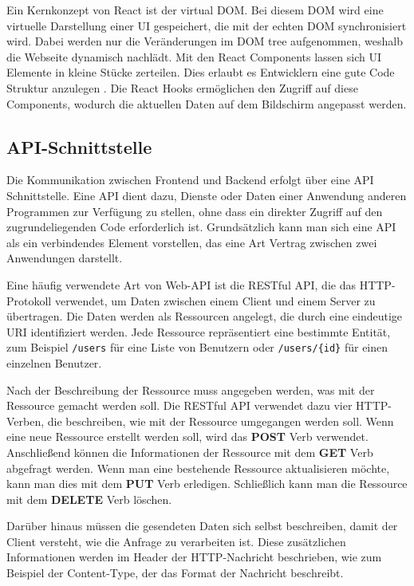 Ein Kernkonzept von React ist der virtual \ac{DOM}. Bei diesem \ac{DOM} wird eine virtuelle Darstellung einer \ac{UI} gespeichert, die mit der echten \ac{DOM} synchronisiert wird. Dabei werden nur die Veränderungen im \ac{DOM} tree aufgenommen, weshalb die Webseite dynamisch nachlädt. Mit den React Components lassen sich \ac{UI} Elemente in kleine Stücke zerteilen. Dies erlaubt es Entwicklern eine gute Code Struktur anzulegen \cite{lazuardy2022modern}. Die React Hooks ermöglichen den Zugriff auf diese Components, wodurch die aktuellen Daten auf dem Bildschirm angepasst werden. \cite{react_website}

\subsection{API-Schnittstelle}

Die Kommunikation zwischen Frontend und Backend erfolgt über eine \ac{API} Schnittstelle. Eine \ac{API} dient dazu, Dienste oder Daten einer Anwendung anderen Programmen zur Verfügung zu stellen, ohne dass ein direkter Zugriff auf den zugrundeliegenden Code erforderlich ist. Grundsätzlich kann man sich eine \ac{API} als ein verbindendes Element vorstellen, das eine Art Vertrag zwischen zwei Anwendungen darstellt. \cite[S.1]{de2017api}

Eine häufig verwendete Art von Web-\ac{API} ist die RESTful \ac{API}, die das \ac{HTTP}-Protokoll verwendet, um Daten zwischen einem Client und einem Server zu übertragen. Die Daten werden als Ressourcen angelegt, die durch eine eindeutige \ac{URI} identifiziert werden. Jede Ressource repräsentiert eine bestimmte Entität, zum Beispiel \texttt{/users} für eine Liste von Benutzern oder \texttt{/users/\{id\}} für einen einzelnen Benutzer. \cite[S.29 ff.]{de2017api}

Nach der Beschreibung der Ressource muss angegeben werden, was mit der Ressource gemacht werden soll. Die RESTful \ac{API} verwendet dazu vier \ac{HTTP}-Verben, die beschreiben, wie mit der Ressource umgegangen werden soll. Wenn eine neue Ressource erstellt werden soll, wird das \textbf{POST} Verb verwendet. Anschließend können die Informationen der Ressource mit dem \textbf{GET} Verb abgefragt werden. Wenn man eine bestehende Ressource aktualisieren möchte, kann man dies mit dem \textbf{PUT} Verb erledigen. Schließlich kann man die Ressource mit dem \textbf{DELETE} Verb löschen. \cite[S.37 ff.]{de2017api}

Darüber hinaus müssen die gesendeten Daten sich selbst beschreiben, damit der Client versteht, wie die Anfrage zu verarbeiten ist. Diese zusätzlichen Informationen werden im Header der \ac{HTTP}-Nachricht beschrieben, wie zum Beispiel der Content-Type, der das Format der Nachricht beschreibt. \cite[S.33]{de2017api}

